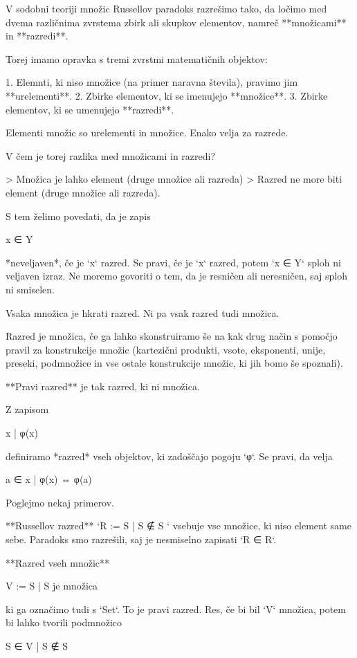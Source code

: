 V sodobni teoriji množic Russellov paradoks razrešimo tako, da ločimo med dvema
različnima zvrstema zbirk ali skupkov elementov, namreč **množicami** in **razredi**.

Torej imamo opravka s tremi zvrstmi matematičnih objektov:

1. Elemnti, ki niso množice (na primer naravna števila), pravimo jim **urelementi**.
2. Zbirke elementov, ki se imenujejo **množice**.
3. Zbirke elementov, ki se umenujejo **razredi**.

Elementi množic so urelementi in množice. Enako velja za razrede.

V čem je torej razlika med množicami in razredi?

> Množica je lahko element (druge množice ali razreda)
> Razred ne more biti element (druge množice ali razreda).

S tem želimo povedati, da je zapis

    x ∈ Y

*neveljaven*, če je `x` razred. Se pravi, če je `x` razred, potem `x ∈ Y` sploh
ni veljaven izraz. Ne moremo govoriti o tem, da je resničen ali neresničen, saj
sploh ni smiselen.

Vsaka množica je hkrati razred. Ni pa vsak razred tudi množica.

Razred je množica, če ga lahko skonstruiramo še na kak drug način s pomočjo
pravil za konstrukcije množic (kartezični produkti, vsote, eksponenti, unije,
preseki, podmnožice in vse ostale konstrukcije množic, ki jih bomo še spoznali).

**Pravi razred** je tak razred, ki ni množica.

Z zapisom

    { x | φ(x) }

definiramo *razred* vseh objektov, ki zadoščajo pogoju `φ`. Se pravi, da velja

    a ∈ { x | φ(x) } ⇔ φ(a)

Poglejmo nekaj primerov.

**Russellov razred** `R := { S | S ∉ S }` vsebuje vse množice, ki niso element
same sebe. Paradoks smo razrešili, saj je nesmiselno zapisati `R ∈ R`.

**Razred vseh množic**

    V := { S | S je množica }

ki ga označimo tudi s `Set`. To je pravi razred. Res, če bi bil `V` množica,
potem bi lahko tvorili podmnožico

    { S ∈ V | S ∉ S }

